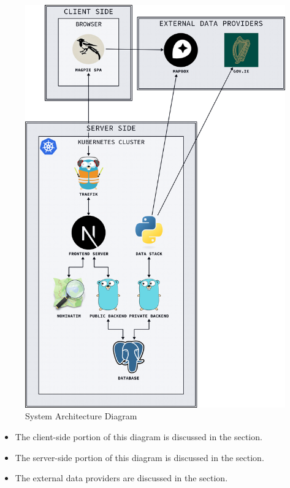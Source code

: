 \begin{figure}[htbp]
  \centering{}
  \includegraphics[width=0.7\columnwidth]{../d2-diagrams/system-diagram/system-diagram-full.png}
  \caption{System Architecture Diagram}
  \label{fig:arcgis}
\end{figure}

\begin{itemize}
  \item The client-side portion of this diagram is discussed in the  section.
  \item The server-side portion of this diagram is discussed in the  section.
  \item The external data providers are discussed in the  section.
\end{itemize}

\newpage{}